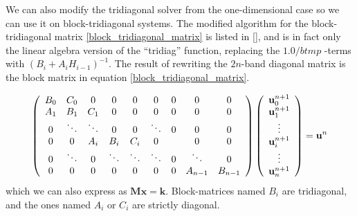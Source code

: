 
We can also modify the tridiagonal solver from the one-dimensional case so we can use it on block-tridiagonal systems. 
The modified algorithm for the block-tridiagonal matrix \ref{block_tridiagonal_matrix} is listed in \ref{}, and is in fact only the linear algebra version of the ``tridiag'' function, replacing the $1.0/btmp$ -terms with $\left(B_i+A_iH_{i-1}\right)^{-1}$. The result of rewriting the $2n$-band diagonal matrix is the block matrix in equation \ref{block_tridiagonal_matrix}.

\begin{align}\label{block_tridiagonal_matrix}
   \left(\begin{array}{c c c c c c c c c}
        B_0 & C_0 &0 &0 &0 &0 &0 &0 &0\\
        A_1 & B_1 & C_1 &0 &0 &0 &0 &0 &0\\
        0&\ddots & \ddots & 0 & 0 & \ddots &0&0&0\\
        0 & 0&A_i & B_i & C_i& 0 &  &0&0\\
        0& \ddots&0&\ddots & \ddots & \ddots & 0 & \ddots &0\\
         0&0 &0 &0&0 &0&0&A_{n-1} & B_{n-1}
       \end{array}\right) \left(\begin{array}{c}
             \mathbf{u}^{n+1}_{0}\\
             \mathbf{u}^{n+1}_{1}\\
             \vdots\\
             \mathbf{u}^{n+1}_{i}\\
             \vdots\\
             \mathbf{u}^{n+1}_{n}
             \end{array}\right) = \mathbf{u}^{n}
\end{align}
which we can also express as $\mathbf M\mathbf{x} = \mathbf{k}$. Block-matrices named $B_i$ are tridiagonal, and the ones named $A_i$ or $C_i$ are strictly diagonal. 

